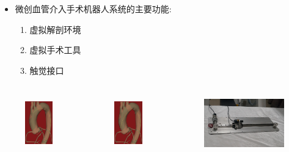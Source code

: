 \begin{frame}
\begin{itemize}
  \item 微创血管介入手术机器人系统的主要功能: 
  \begin{enumerate}
    \item 虚拟解剖环境
    \item 虚拟手术工具
    \item 触觉接口
  \end{enumerate}
\end{itemize}
\begin{columns}[b,onlytextwidth]
\begin{column}{.25\textwidth}
\begin{figure}[t]
\centering
\includegraphics[height=1.0in]{../../Figures/background/simulation2.eps}
\end{figure}
\end{column}
\begin{column}{.25\textwidth}
\begin{figure}[t]
\centering
\includegraphics[height=1.0in]{../../Figures/background/simulation.eps}
\end{figure}
\end{column}
\begin{column}{.5\textwidth}
\begin{figure}[t]
\centering
\includegraphics[height=1.0in]{../../Figures/background/interface.eps}
\end{figure}
\end{column}
\end{columns}
\end{frame}